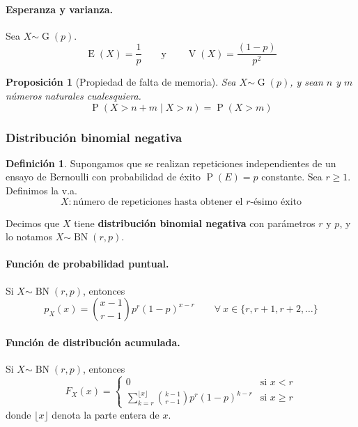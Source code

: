 \documentclass[11pt]{article}
\theoremstyle{plain}
\newtheorem*{pro}{Proposición}
\theoremstyle{definition}
\newtheorem*{defi}{Definición}
\theoremstyle{remark}
\newcommand{\deft}[1]{\textbf{#1}}  %
\newcommand{\proba}{\ensuremath{\operatorname{P}}}  %
\newcommand{\esp}[0]{\ensuremath{\operatorname{E}}}  %
\newcommand{\var}[0]{\ensuremath{\operatorname{V}}}  %
\newcommand{\foralle}{\ensuremath{\forall \ }}  %
\newcommand{\dist}[1]{\ensuremath{\sim \operatorname{#1}}}  %
\begin{document}
      \paragraph{Esperanza y varianza.}
      Sea $X \dist{G}(p)$.
      \[ \esp(X) = \frac{1}{p} \qquad \text{y} \qquad \var(X) = \frac{(1 - p)}{p^2} \]

      \begin{pro} [Propiedad de falta de memoria]
        Sea $X \dist{G}(p)$, y sean $n$ y $m$ números naturales cualesquiera.
        \[ \proba(X > n + m \mid X > n) = \proba(X > m) \]
      \end{pro}

    \subsubsection{Distribución binomial negativa}

      \begin{defi}
        Supongamos que se realizan repeticiones independientes de un ensayo de Bernoulli con probabilidad de éxito $\proba(E) = p$ constante. Sea $r \geq 1$. Definimos la v.a.
        \[ X : \text{número de repeticiones hasta obtener el $r$-ésimo éxito} \]

        Decimos que $X$ tiene \deft{distribución binomial negativa} con parámetros $r$ y $p$, y lo notamos $X \dist{BN}(r,p)$.
      \end{defi}

      \paragraph{Función de probabilidad puntual.}
      Si $X \dist{BN}(r,p)$, entonces
      \[ p_X(x) = \binom{x - 1}{r - 1} p^r (1 - p)^{x - r} \qquad \foralle x \in \lbrace r, r + 1, r + 2, \dots \rbrace \]

      \paragraph{Función de distribución acumulada.}
      Si $X \dist{BN}(r,p)$, entonces
      \[ F_X(x) = \begin{cases}
        0 & \text{si $x < r$} \\
        \displaystyle \sum_{k = r}^{\lfloor x \rfloor} \binom{k - 1}{r - 1} p^r (1 - p)^{k - r} & \text{si $x \geq r$}
      \end{cases}  \]
      donde $\lfloor x \rfloor$ denota la parte entera de $x$.
\end{document}
